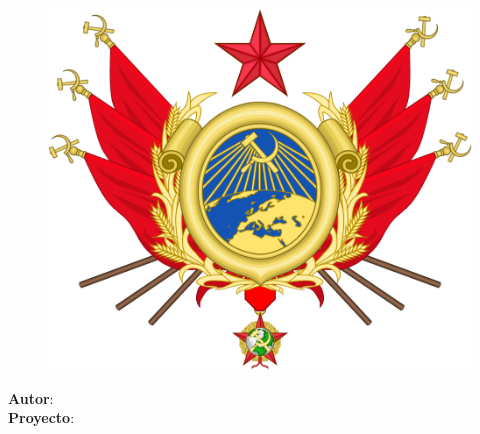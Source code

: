 \makeatletter
\begin{titlepage}
	\begin{center}
		\vspace*{1cm}
		
		\Large
		\textbf{\@title}
		
		\vspace{1.5cm}
		
		\thesistype{}
		
		\vspace{1cm}
		
		\begin{figure}[htbp]
			\centering
			\includegraphics[width=.7\linewidth]{./A.imagenes/Escudo.png}
		\end{figure}
		
		\vspace{1cm}
		
		\Large
		\textbf{Autor}: \thesisauthor{}\\ %
		\Large
		\textbf{Proyecto}: \proyecto{}\\
		
		\vspace{2cm}
		\large
		
		\vspace{1cm}
		\@date
		
	\end{center}
\end{titlepage}
\makeatother
